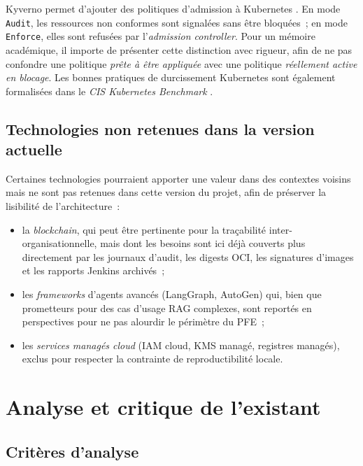 Kyverno permet d'ajouter des politiques d'admission à Kubernetes \cite{kyverno_docs}. En mode \texttt{Audit}, les ressources non conformes sont signalées sans être bloquées~; en mode \texttt{Enforce}, elles sont refusées par l'\textit{admission controller}. Pour un mémoire académique, il importe de présenter cette distinction avec rigueur, afin de ne pas confondre une politique \textit{prête à être appliquée} avec une politique \textit{réellement active en blocage}. Les bonnes pratiques de durcissement Kubernetes sont également formalisées dans le \textit{CIS Kubernetes Benchmark} \cite{cis_k8s_benchmark}.

\subsection{Technologies non retenues dans la version actuelle}

Certaines technologies pourraient apporter une valeur dans des contextes voisins mais ne sont pas retenues dans cette version du projet, afin de préserver la lisibilité de l'architecture~:
\begin{itemize}
    \item la \textit{blockchain}, qui peut être pertinente pour la traçabilité inter-organisationnelle, mais dont les besoins sont ici déjà couverts plus directement par les journaux d'audit, les digests OCI, les signatures d'images et les rapports Jenkins archivés~;
    \item les \textit{frameworks} d'agents avancés (LangGraph, AutoGen) qui, bien que prometteurs pour des cas d'usage RAG complexes, sont reportés en perspectives pour ne pas alourdir le périmètre du PFE~;
    \item les \textit{services managés cloud} (IAM cloud, KMS managé, registres managés), exclus pour respecter la contrainte de reproductibilité locale.
\end{itemize}

\section{Analyse et critique de l'existant}
\label{sec:existant}

\subsection{Critères d'analyse}

